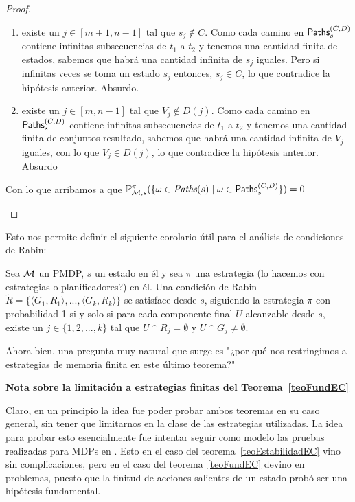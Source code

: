 \begin{proof}
\begin{itemize}
		      \begin{enumerate}
			      \item existe un $j \in [m+1, n-1]$ tal que $s_j \notin C$. Como cada camino en
			            $\textsf{Paths}_s^{(C,D)}$ contiene infinitas subsecuencias de $t_1$ a $t_2$ y tenemos
			            una cantidad finita de estados, sabemos que habrá una cantidad infinita de
			            $s_j$ iguales. Pero si infinitas veces se toma un estado $s_j$ entonces, $s_j
				            \in C$, lo que contradice la hipótesis anterior. Absurdo.

			      \item existe un $j \in [m, n-1]$ tal que $V_j \notin D(j)$. Como cada camino en
			            $\textsf{Paths}_s^{(C,D)}$ contiene infinitas subsecuencias de $t_1$ a $t_2$ y tenemos
			            una cantidad finita de conjuntos resultado, sabemos que habrá una cantidad
			            infinita de $V_j$ iguales, con lo que $V_j \in D(j)$, lo que contradice la
			            hipótesis anterior. Absurdo
		      \end{enumerate}
		      Con lo que arribamos a que $\mathbb{P}^\pi_{\mathcal{M}, s}(\{ \omega \in \textit{Paths}(s) \mid \omega \in \textsf{Paths}_s^{(C,D)}\}) = 0  $
	\end{itemize}

\end{proof}

Esto nos permite definir el siguiente corolario útil para el análisis de
condiciones de Rabin:

\begin{corollary}
	\label{adaptB30}
	Sea $\mathcal{M}$ un PMDP, $s$ un estado en él y sea $\pi$ una estrategia (lo hacemos con estrategias o planificadores?) en él. Una condición de Rabin $\widetilde{R} = \{ \langle G_1, R_1 \rangle, ...,  \langle G_k, R_k \rangle \}$ se satisface desde $s$, siguiendo la estrategia $\pi$ con probabilidad 1 si y solo si para cada componente final $U$ alcanzable desde $s$, existe un $j \in \{ 1, 2, ..., k\}$ tal que $U \cap R_j = \emptyset$ y $U \cap G_j \neq \emptyset$.
\end{corollary}

Ahora bien, una pregunta muy natural que surge es "¿por qué nos restringimos a
estrategias de memoria finita en este último teorema?"

\textbf{Nota sobre la limitación a estrategias finitas del Teorema~\ref{teoFundEC}}

Claro, en un principio la idea fue poder probar ambos teoremas en su caso
general, sin tener que limitarnos en la clase de las estrategias utilizadas. La
idea para probar esto esencialmente fue intentar seguir como modelo las pruebas
realizadas para MDPs en \cite{AlfaroThesis,BaierKatoen}. Esto en el caso del
teorema~\ref{teoEstabilidadEC} vino sin complicaciones, pero en el caso del
teorema~\ref{teoFundEC} devino en problemas, puesto que la finitud de acciones
salientes de un estado probó ser una hipótesis fundamental.

